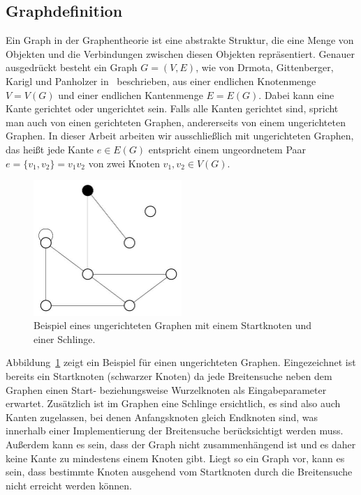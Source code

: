 \documentclass[11pt,a4paper]{article}
\begin{document}
\subsection{Graphdefinition}
Ein Graph in der Graphentheorie ist eine abstrakte Struktur, die eine Menge von Objekten und die Verbindungen zwischen diesen Objekten repräsentiert. Genauer ausgedrückt besteht ein Graph \(G = (V, E)\), wie von Drmota, Gittenberger, Karigl und Panholzer in~\cite{mathematik} beschrieben,  aus einer endlichen Knotenmenge \(V = V(G)\) und einer endlichen Kantenmenge \(E = E(G)\). Dabei kann eine Kante gerichtet oder ungerichtet sein. Falls alle Kanten gerichtet sind, spricht man auch von einen gerichteten Graphen, andererseits von einem ungerichteten Graphen. In dieser Arbeit arbeiten wir ausschließlich mit ungerichteten Graphen, das heißt jede Kante \(e \in E(G)\) entspricht einem ungeordnetem Paar \(e = \{ v_{1},v_{2} \} = v_{1}v_{2}\) von zwei Knoten \(v_{1}, v_{2} \in V(G)\).
\begin{figure}[h]
 	\centering
	\includegraphics[width=0.5\textwidth]{graph}
 	\caption{Beispiel eines ungerichteten Graphen mit einem Startknoten und einer Schlinge.}
	\label{fig:graph}
\end{figure}
Abbildung~\ref{fig:graph} zeigt ein Beispiel für einen ungerichteten Graphen. Eingezeichnet ist bereits ein Startknoten (schwarzer Knoten) da jede Breitensuche neben dem Graphen einen Start- beziehungsweise Wurzelknoten als Eingabeparameter erwartet. Zusätzlich ist im Graphen eine Schlinge ersichtlich, es sind also auch Kanten zugelassen, bei denen Anfangsknoten gleich Endknoten sind, was innerhalb einer Implementierung der Breitensuche berücksichtigt werden muss. Außerdem kann es sein, dass der Graph nicht zusammenhängend ist und es daher keine Kante zu mindestens einem Knoten gibt. Liegt so ein Graph vor, kann es sein, dass bestimmte Knoten ausgehend vom Startknoten durch die Breitensuche nicht erreicht werden können.\\
\end{document}
